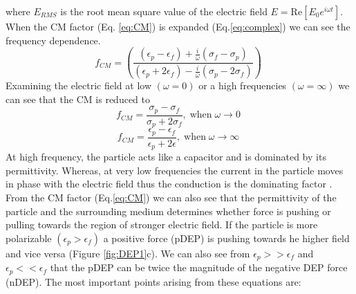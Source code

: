 \documentclass[final]{jyflluk}
\begin{document}
%
where $E_{RMS}$ is the root mean square value of the electric field $E=\mathrm{Re}[E_0 e^{i \omega t}]$. When the CM factor (Eq. \ref{eq:CM})  is expanded (Eq.\ref{eq:complex}) we can see the frequency dependence.
%
\begin{equation}
   \label{eq:CM_open}
   f_{CM} = \left(\frac{(\epsilon_{p} - \epsilon_{f}) + \frac{i}{\omega} (\sigma_f - \sigma_p)}
   {(\epsilon_{p} + 2\epsilon_{f}) - \frac{i}{\omega} (\sigma_p - 2\sigma_f)} \right)\;
\end{equation}
%
Examining the electric field at low  $(\omega = 0)$ or a high frequencies $(\omega = \infty)$ we can see that the CM is reduced to 
\begin{equation}
   \label{eq:wat0}
   f_{CM} = \frac{\sigma_p - \sigma_f} {\sigma_p + 2\sigma_f}, \; \mathrm{when } \;\omega \rightarrow 0 \;
\end{equation}
\begin{equation}
   \label{eq:watinf}
   f_{CM} = \frac{\epsilon_p - \epsilon_f} {\epsilon_p + 2\epsilon}, \;\mathrm{when } \;\omega \rightarrow \infty\;
\end{equation}
At high frequency, the particle acts like a capacitor and is dominated by its permittivity. Whereas, at very low frequencies the current in the particle moves in phase with the electric field thus the conduction is the dominating factor \cite{pethig_review_2010, li_review_2014, cetin_dielectrophoresis_2011}. 
From the CM factor (Eq.\ref{eq:CM}) we can also see that the permittivity of the particle and the surrounding medium determines whether force is pushing or pulling towards the region of stronger electric field. If the particle is more polarizable $(\epsilon_p>\epsilon_f)$ a positive force (pDEP) is pushing towards he higher field and vice versa (Figure \ref{fig:DEP1}c). We can also see from $\epsilon_p>>\epsilon_f$ and  $\epsilon_p<<\epsilon_f $ that the pDEP can be twice the magnitude of the negative DEP force (nDEP).
The most important points arising from these equations are:
\end{document}
